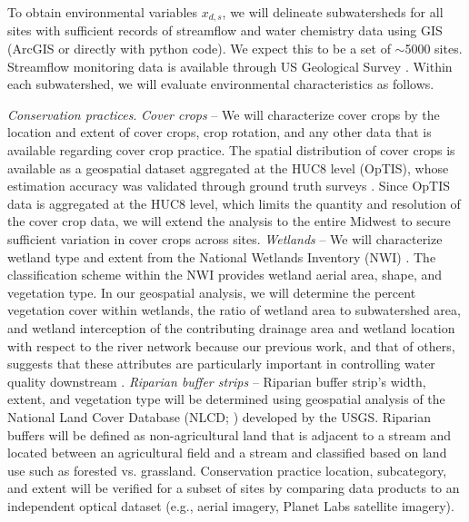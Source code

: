 \documentclass[12pt, class=article, crop=false]{standalone}
\begin{document}
To obtain environmental variables $x_{d,s}$, we will delineate subwatersheds for all sites with sufficient records of streamflow and water chemistry data using GIS (ArcGIS or directly with python code).
We expect this to be a set of $\sim$5000 sites. Streamflow monitoring data is available through US Geological Survey \citep{us_geological_survey_national_2001}.
Within each subwatershed, we will evaluate environmental characteristics as follows.

\textit{Conservation practices}.
\textit{Cover crops} -- We will characterize cover crops by the location and extent of cover crops, crop rotation, and any other data that is available regarding cover crop practice. 
The spatial distribution of cover crops is available as a geospatial dataset aggregated at the HUC8 level (OpTIS), whose estimation accuracy was validated through ground truth surveys \citep{the_nature_conservancy_optis_2023}.
Since OpTIS data is aggregated at the HUC8 level, which limits the quantity and resolution of the cover crop data, we will extend the analysis to the entire Midwest to secure sufficient variation in cover crops across sites.
\textit{Wetlands} -- We will characterize wetland type and extent from the National Wetlands Inventory (NWI) \citep{us_fish_and_wildlife_service_national_2024}.
The classification scheme within the NWI provides wetland aerial area, shape, and vegetation type.
In our geospatial analysis, we will determine the percent vegetation cover within wetlands, the ratio of wetland area to subwatershed area, and wetland interception of the contributing drainage area and wetland location with respect to the river network because our previous work, and that of others, suggests that these attributes are particularly important in controlling water quality downstream \citep{hansen_coupling_2016, cheng_maximizing_2020}.
\textit{Riparian buffer strips} -- Riparian buffer strip's width, extent, and vegetation type will be determined using geospatial analysis of the National Land Cover Database (NLCD; \citep{wickham_thematic_2021, wickham_thematic_2023}) developed by the USGS. Riparian buffers will be defined as non-agricultural land that is adjacent to a stream and located between an agricultural field and a stream and classified based on land use such as forested vs. grassland. Conservation practice location, subcategory, and extent will be verified for a subset of sites by comparing data products to an independent optical dataset (e.g., aerial imagery, Planet Labs satellite imagery).
\end{document}
